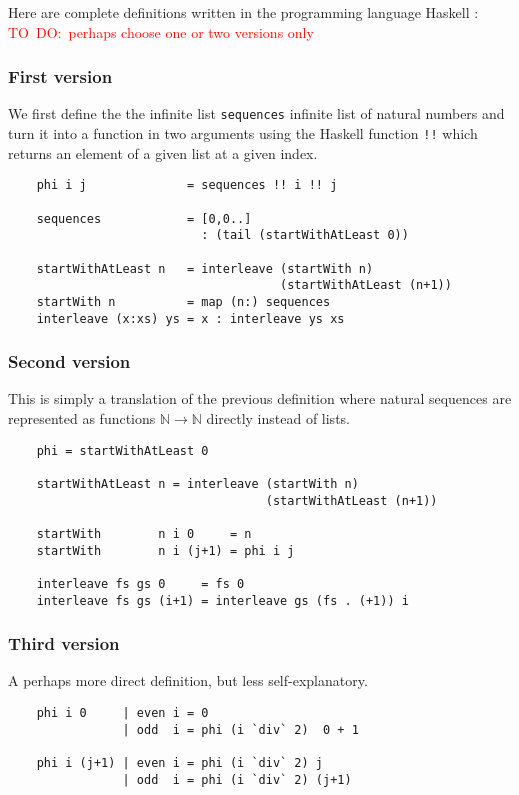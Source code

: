 \documentclass[envcountsame]{llncs}
\newcommand{\todo}[1]{\textcolor{red}{TO~DO:~#1}}
\newcommand{\N}{\mathbb{N}}
\begin{document}
Here are complete definitions written in the programming language Haskell : \todo{perhaps choose one or two  versions only}



\subsubsection{First version}
We first define the the infinite list \texttt{sequences} infinite list of natural numbers and turn it into a function in two arguments using the Haskell function \verb+!!+ which returns an element of a given list at a given index.
\begin{verbatim}
    phi i j              = sequences !! i !! j
    
    sequences            = [0,0..]
                           : (tail (startWithAtLeast 0))
    
    startWithAtLeast n   = interleave (startWith n) 
                                      (startWithAtLeast (n+1))
    startWith n          = map (n:) sequences
    interleave (x:xs) ys = x : interleave ys xs
\end{verbatim}

\subsubsection{Second version} This is simply a translation of the previous definition where natural sequences are represented as functions $\N\to\N$ directly instead of lists.\begin{verbatim}
    phi = startWithAtLeast 0
    
    startWithAtLeast n = interleave (startWith n) 
                                    (startWithAtLeast (n+1))
    
    startWith        n i 0     = n
    startWith        n i (j+1) = phi i j
    
    interleave fs gs 0     = fs 0 
    interleave fs gs (i+1) = interleave gs (fs . (+1)) i
\end{verbatim}

\subsubsection{Third version} A perhaps more direct definition, but less self-explanatory.
\begin{verbatim}
    phi i 0     | even i = 0 
                | odd  i = phi (i `div` 2)  0 + 1
                
    phi i (j+1) | even i = phi (i `div` 2) j
                | odd  i = phi (i `div` 2) (j+1)    
\end{verbatim}
\end{document}
